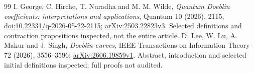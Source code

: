 \documentclass[11pt]{article}
\theoremstyle{remark}\newtheorem{remark}[theorem]{Remark}
\begin{document}
\begin{thebibliography}{99}
 I. George, C. Hirche, T. Nuradha and M. M. Wilde, \emph{Quantum Doeblin coefficients: interpretations and applications}, Quantum 10 (2026), 2115, \href{https://doi.org/10.22331/q-2026-05-22-2115}{doi:10.22331/q-2026-05-22-2115}; \href{https://arxiv.org/abs/2503.22823v3}{arXiv:2503.22823v3}. Selected definitions and contraction propositions inspected, not the entire article.
 D. Lee, W. Lu, A. Makur and J. Singh, \emph{Doeblin curves}, IEEE Transactions on Information Theory 72 (2026), 3556--3596; \href{https://arxiv.org/abs/2606.19859v1}{arXiv:2606.19859v1}. Abstract, introduction and selected initial definitions inspected; full proofs not audited.
\end{thebibliography}
\end{document}
